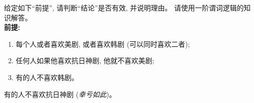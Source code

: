 \documentclass[a4paper, justified]{tufte-handout}
\begin{document}
\begin{problem}
  给定如下``前提'', 请判断``结论''是否有效, 并说明理由。
  请使用一阶谓词逻辑的知识解答。
   \\[10pt]

  {\bf 前提:}
  \begin{enumerate}[(1)]
    \item 每个人或者喜欢美剧, 或者喜欢韩剧 (可以同时喜欢二者);
    \item 任何人如果他喜欢抗日神剧, 他就不喜欢美剧;
    \item 有的人不喜欢韩剧。
  \end{enumerate}

  \vspace{0.20cm}
   有的人不喜欢抗日神剧 ({\it 幸亏如此})。
\end{problem}
\end{document}
